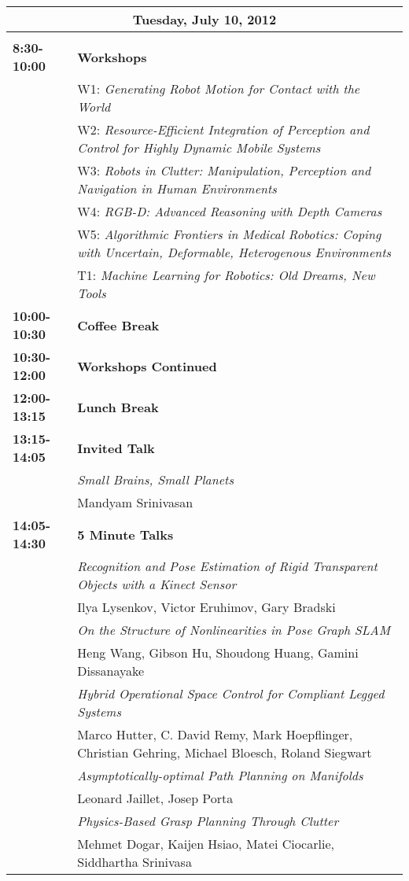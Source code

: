 \newpage
\begin{tabular}{lp{13.8cm}}
\hline
\multicolumn{2}{|c|}{{\bf Tuesday, July 10, 2012}}\\
\hline\\
{\bf 8:30-10:00} & {\bf Workshops} \\[2mm]
& W1: {\em Generating Robot Motion for Contact with the World}\\
& W2: {\em Resource-Efficient Integration of Perception and Control for Highly Dynamic Mobile Systems}\\
& W3: {\em Robots in Clutter: Manipulation, Perception and Navigation in Human Environments}\\
& W4: {\em RGB-D: Advanced Reasoning with Depth Cameras}\\
& W5: {\em Algorithmic Frontiers in Medical Robotics: Coping with Uncertain, Deformable, Heterogenous Environments}\\
& T1: {\em Machine Learning for Robotics: Old Dreams, New Tools}\\[2mm]

{\bf 10:00-10:30} & {\bf Coffee Break} \\[4mm]

{\bf 10:30-12:00} & {\bf Workshops Continued} \\[4mm]

{\bf 12:00-13:15} & {\bf Lunch Break} \\[4mm]

{\bf 13:15-14:05} & {\bf Invited Talk} \\[2mm]
& \em{Small Brains, Small Planets}\\
& Mandyam Srinivasan\\[2mm]

{\bf 14:05-14:30} & {\bf 5 Minute Talks} \\[2mm]
& \em{ Recognition and Pose Estimation of Rigid Transparent Objects with a Kinect Sensor }\\
& Ilya Lysenkov\label{Lysenkov}, Victor Eruhimov, Gary Bradski\\[2mm]
& \em{ On the Structure of Nonlinearities in Pose Graph SLAM}\\
& Heng Wang\label{Wang2}, Gibson Hu, Shoudong Huang, Gamini Dissanayake\\[2mm]
& \em{ Hybrid Operational Space Control for Compliant Legged Systems}\\
& Marco Hutter\label{Hutter}, C. David Remy, Mark Hoepflinger, Christian Gehring, Michael Bloesch, Roland Siegwart\\[2mm]
& \em{ Asymptotically-optimal Path Planning on Manifolds}\\
& Leonard Jaillet\label{Jaillet}, Josep Porta\\[2mm]
& \em{ Physics-Based Grasp Planning Through Clutter}\\
& Mehmet Dogar\label{Dogar}, Kaijen Hsiao, Matei Ciocarlie, Siddhartha Srinivasa\\[2mm]


\end{tabular}
